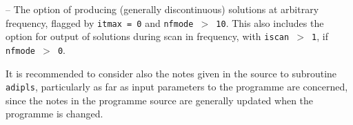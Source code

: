 \item{--} The option of producing (generally discontinuous) solutions
at arbitrary frequency, flagged by {\tt itmax = 0} and {\tt nfmode $>$ 10}.
This also includes the option for output of solutions during scan in
frequency, with {\tt iscan $>$ 1}, if {\tt nfmode $>$ 0}.


It is recommended to consider also the notes given
in the source to subroutine {\tt adipls}, particularly as far as
input parameters to the programme are concerned, since the
notes in the programme source are generally updated when the
programme is changed.

